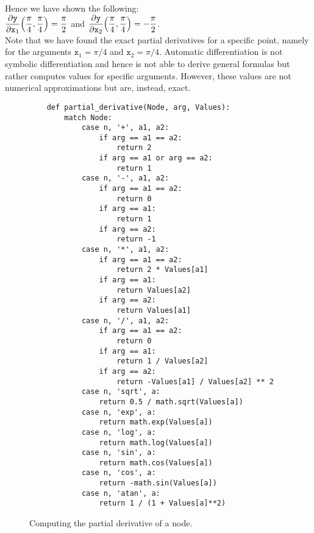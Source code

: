 Hence we have shown the following:
\\[0.2cm]
\hspace*{1.3cm}
$\displaystyle \frac{\partial \mathtt{y}}{\partial \mathtt{x}_1}\Bigl(\frac{\pi}{4}, \frac{\pi}{4}\Bigr) = \frac{\pi}{2}$ \quad and \quad
$\displaystyle \frac{\partial \mathtt{y}}{\partial \mathtt{x}_2}\Bigl(\frac{\pi}{4}, \frac{\pi}{4}\Bigr) = - \frac{\pi}{2}$.
\\[0.2cm]     
Note that we have found the exact partial derivatives for a specific point, namely for the arguments
$\mathtt{x}_1 = \pi/4$ and $\mathtt{x}_2 = \pi/4$.  Automatic differentiation is not symbolic differentiation
and hence is not able to derive general formulas but rather computes values for specific arguments.  However,
these values are not numerical approximations but are, instead, exact.
\eoxs

\begin{figure}[!ht]
\centering
\begin{verbatim}
    def partial_derivative(Node, arg, Values):
        match Node:
            case n, '+', a1, a2:
                if arg == a1 == a2:
                    return 2
                if arg == a1 or arg == a2:
                    return 1
            case n, '-', a1, a2:
                if arg == a1 == a2:
                    return 0
                if arg == a1:
                    return 1
                if arg == a2:
                    return -1
            case n, '*', a1, a2:
                if arg == a1 == a2:
                    return 2 * Values[a1]
                if arg == a1:
                    return Values[a2]
                if arg == a2:
                    return Values[a1]
            case n, '/', a1, a2:
                if arg == a1 == a2:
                    return 0
                if arg == a1:
                    return 1 / Values[a2]
                if arg == a2:
                    return -Values[a1] / Values[a2] ** 2
            case n, 'sqrt', a:
                return 0.5 / math.sqrt(Values[a])
            case n, 'exp', a:
                return math.exp(Values[a])
            case n, 'log', a:
                return math.log(Values[a])
            case n, 'sin', a:
                return math.cos(Values[a])
            case n, 'cos', a:
                return -math.sin(Values[a])
            case n, 'atan', a:
                return 1 / (1 + Values[a]**2)
\end{verbatim}
\vspace*{-0.3cm}
\caption{Computing the partial derivative of a node.}
\label{fig:Reverse-Mode-AD.ipynb:partial_derivative}
\end{figure}

